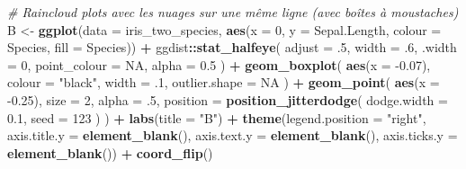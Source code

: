 \documentclass[
  french,
]{book}
\newenvironment{Shaded}{\begin{snugshade}}{\end{snugshade}}
\newcommand{\CommentTok}[1]{\textcolor[rgb]{0.56,0.35,0.01}{\textit{#1}}}
\newcommand{\DataTypeTok}[1]{\textcolor[rgb]{0.13,0.29,0.53}{#1}}
\newcommand{\DecValTok}[1]{\textcolor[rgb]{0.00,0.00,0.81}{#1}}
\newcommand{\FloatTok}[1]{\textcolor[rgb]{0.00,0.00,0.81}{#1}}
\newcommand{\KeywordTok}[1]{\textcolor[rgb]{0.13,0.29,0.53}{\textbf{#1}}}
\newcommand{\NormalTok}[1]{#1}
\newcommand{\OperatorTok}[1]{\textcolor[rgb]{0.81,0.36,0.00}{\textbf{#1}}}
\newcommand{\OtherTok}[1]{\textcolor[rgb]{0.56,0.35,0.01}{#1}}
\newcommand{\StringTok}[1]{\textcolor[rgb]{0.31,0.60,0.02}{#1}}
\begin{document}
\begin{Shaded}
\begin{Highlighting}[]
\CommentTok{# Raincloud plots avec les nuages sur une même ligne (avec boîtes à moustaches)}
\NormalTok{B <-}
\StringTok{  }\KeywordTok{ggplot}\NormalTok{(}\DataTypeTok{data =}\NormalTok{ iris_two_species, }
         \KeywordTok{aes}\NormalTok{(}\DataTypeTok{x =} \DecValTok{0}\NormalTok{, }\DataTypeTok{y =}\NormalTok{ Sepal.Length, }\DataTypeTok{colour =}\NormalTok{ Species, }\DataTypeTok{fill =}\NormalTok{ Species)) }\OperatorTok{+}
\StringTok{  }\NormalTok{ggdist}\OperatorTok{::}\KeywordTok{stat_halfeye}\NormalTok{(}
    \DataTypeTok{adjust =} \FloatTok{.5}\NormalTok{, }
    \DataTypeTok{width =} \FloatTok{.6}\NormalTok{, }
    \DataTypeTok{.width =} \DecValTok{0}\NormalTok{, }
    \DataTypeTok{point_colour =} \OtherTok{NA}\NormalTok{,}
    \DataTypeTok{alpha =} \FloatTok{0.5}
\NormalTok{    ) }\OperatorTok{+}
\StringTok{  }\KeywordTok{geom_boxplot}\NormalTok{(}
    \KeywordTok{aes}\NormalTok{(}\DataTypeTok{x =} \FloatTok{-0.07}\NormalTok{),}
    \DataTypeTok{colour =} \StringTok{"black"}\NormalTok{,}
    \DataTypeTok{width =} \FloatTok{.1}\NormalTok{, }
    \DataTypeTok{outlier.shape =} \OtherTok{NA}
\NormalTok{  ) }\OperatorTok{+}
\StringTok{  }\KeywordTok{geom_point}\NormalTok{(}
    \KeywordTok{aes}\NormalTok{(}\DataTypeTok{x =} \FloatTok{-0.25}\NormalTok{),}
    \DataTypeTok{size =} \DecValTok{2}\NormalTok{, }
    \DataTypeTok{alpha =} \FloatTok{.5}\NormalTok{,}
    \DataTypeTok{position =} \KeywordTok{position_jitterdodge}\NormalTok{(}
                          \DataTypeTok{dodge.width =} \FloatTok{0.1}\NormalTok{,}
                          \DataTypeTok{seed =} \DecValTok{123}
\NormalTok{                    )}
\NormalTok{  ) }\OperatorTok{+}
\StringTok{  }\KeywordTok{labs}\NormalTok{(}\DataTypeTok{title =} \StringTok{"B"}\NormalTok{) }\OperatorTok{+}
\StringTok{  }\KeywordTok{theme}\NormalTok{(}\DataTypeTok{legend.position =} \StringTok{"right"}\NormalTok{,}
        \DataTypeTok{axis.title.y =} \KeywordTok{element_blank}\NormalTok{(),}
        \DataTypeTok{axis.text.y =} \KeywordTok{element_blank}\NormalTok{(),}
        \DataTypeTok{axis.ticks.y =} \KeywordTok{element_blank}\NormalTok{()) }\OperatorTok{+}
\StringTok{  }\KeywordTok{coord_flip}\NormalTok{() }



\end{Highlighting}
\end{Shaded}
\end{document}
